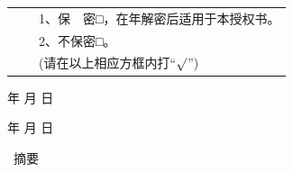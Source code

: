 {{            \vspace{0.5cm}
            \begin{center}\hei\xiaoer{\@authorizedtitle}\end{center}\par
            \vspace{0.5\baselineskip}
            \song{}\par
            \song{}\par
            \begin{tabular}{lll}
                \qquad\qquad&\qquad\quad\qquad&\hspace{0.5em} 1、保　密□，在\underline{\qquad\qquad}年解密后适用于本授权书。 \\
                \qquad\qquad&\qquad\quad\qquad&\hspace{0.5em} 2、不保密□。                                       \\
                \qquad\qquad&\qquad\quad\qquad&\hspace{0.5em} (请在以上相应方框内打``$\surd$'')
            \end{tabular}
            \par
            \vspace{1\baselineskip}
            \song\xiaosi
            \@studentsign \makebox[3cm][s]{} \qquad\qquad\qquad  
            \@cdatename \the\year{} 年 \makebox[0.5cm][s]{} 月 \makebox[0.5cm][s]{} 日\par
            \vspace{0.25\baselineskip}
            \@teachersign \makebox[3cm][s]{} \qquad\qquad\qquad  
            \@cdatename \the\year{} 年 \makebox[0.5cm][s]{} 月 \makebox[0.5cm][s]{} 日
        }
        \clearpage

         {
            \begin{center}
                \hei\xiaoer{\@title}
            \end{center}
            \vspace{-10pt}
            \begin{center}
                \hei\xiaoer\ 摘\qquad 要
            \end{center}\par
            \song{}\@cabstract
            \vspace{\baselineskip}
            \hangindent=52.3pt
            \newline\noindent
            {\hei{} \hei\xiaosi\@ckeywords}
        }
        \clearpage
        
}

